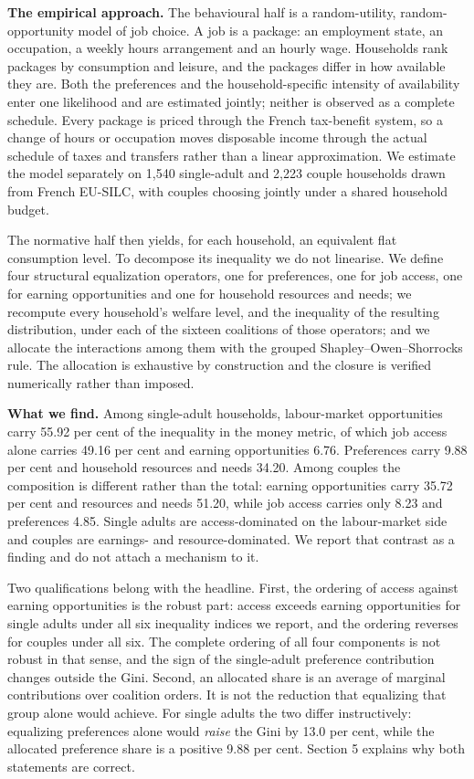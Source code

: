 \textbf{The empirical approach.} The behavioural half is a random-utility, random-opportunity model of job choice. A job is a package: an employment state, an occupation, a weekly hours arrangement and an hourly wage. Households rank packages by consumption and leisure, and the packages differ in how available they are. Both the preferences and the household-specific intensity of availability enter one likelihood and are estimated jointly; neither is observed as a complete schedule. Every package is priced through the French tax-benefit system, so a change of hours or occupation moves disposable income through the actual schedule of taxes and transfers rather than a linear approximation. We estimate the model separately on 1,540 single-adult and 2,223 couple households drawn from French EU-SILC, with couples choosing jointly under a shared household budget.

The normative half then yields, for each household, an equivalent flat consumption level. To decompose its inequality we do not linearise. We define four structural equalization operators, one for preferences, one for job access, one for earning opportunities and one for household resources and needs; we recompute every household's welfare level, and the inequality of the resulting distribution, under each of the sixteen coalitions of those operators; and we allocate the interactions among them with the grouped Shapley--Owen--Shorrocks rule. The allocation is exhaustive by construction and the closure is verified numerically rather than imposed.

\textbf{What we find.} Among single-adult households, labour-market opportunities carry 55.92 per cent of the inequality in the money metric, of which job access alone carries 49.16 per cent and earning opportunities 6.76. Preferences carry 9.88 per cent and household resources and needs 34.20. Among couples the composition is different rather than the total: earning opportunities carry 35.72 per cent and resources and needs 51.20, while job access carries only 8.23 and preferences 4.85. Single adults are access-dominated on the labour-market side and couples are earnings- and resource-dominated. We report that contrast as a finding and do not attach a mechanism to it.

Two qualifications belong with the headline. First, the ordering of access against earning opportunities is the robust part: access exceeds earning opportunities for single adults under all six inequality indices we report, and the ordering reverses for couples under all six. The complete ordering of all four components is not robust in that sense, and the sign of the single-adult preference contribution changes outside the Gini. Second, an allocated share is an average of marginal contributions over coalition orders. It is not the reduction that equalizing that group alone would achieve. For single adults the two differ instructively: equalizing preferences alone would \emph{raise} the Gini by 13.0 per cent, while the allocated preference share is a positive 9.88 per cent. Section 5 explains why both statements are correct.

